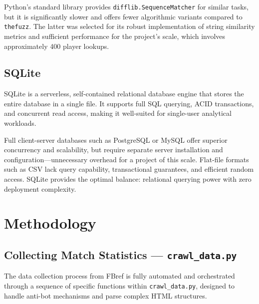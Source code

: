 \documentclass[a4paper,12pt]{report}
\begin{document}
Python's standard library provides \texttt{difflib.}\allowbreak\texttt{SequenceMatcher} for similar tasks, but it is significantly slower and offers fewer algorithmic variants compared to \texttt{thefuzz}. The latter was selected for its robust implementation of string similarity metrics and sufficient performance for the project's scale, which involves approximately 400 player lookups.

\subsection{SQLite}

SQLite is a serverless, self-contained relational database engine that stores the entire database in a single file. It supports full SQL querying, ACID transactions, and concurrent read access, making it well-suited for single-user analytical workloads.

Full client-server databases such as PostgreSQL or MySQL offer superior concurrency and scalability, but require separate server installation and configuration---unnecessary overhead for a project of this scale. Flat-file formats such as CSV lack query capability, transactional guarantees, and efficient random access. SQLite provides the optimal balance: relational querying power with zero deployment complexity.

\section{Methodology}

\subsection{Collecting Match Statistics --- \texttt{crawl\_data.py}}

The data collection process from FBref is fully automated and orchestrated through a sequence of specific functions within \texttt{crawl\_data.py}, designed to handle anti-bot mechanisms and parse complex HTML structures.
\end{document}
